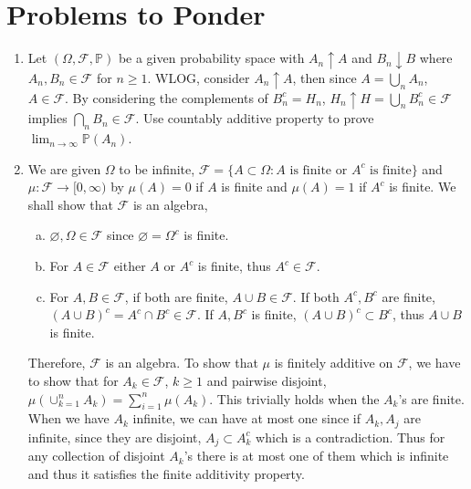 \documentclass[a4paper,10pt]{article}
\theoremstyle{definition}
\begin{document}
\section*{Problems to Ponder}

\begin{enumerate}
\item Let $(\Omega, \mathcal{F}, \mathbb{P})$ be a given probability space with $A_n \uparrow A$ and $B_n \downarrow B$ where $A_n, B_n \in \mathcal{F}$ for $n \geq 1$. WLOG, consider $A_n \uparrow A$, then since $A = \bigcup_nA_n$, $A \in \mathcal{F}$. By considering the complements of $B_n^c = H_n$, $H_n \uparrow H = \bigcup_n B_n^c \in \mathcal{F}$ implies $\bigcap_nB_n \in \mathcal{F}$. Use countably additive property to prove $\lim_{n\to\infty}\mathbb{P}(A_n)$. 

\item We are given $\Omega$ to be infinite, $\mathcal{F} = \{A \subset \Omega: A \text{ is finite or } A^c \text{ is finite}\}$ and $\mu: \mathcal{F}\to [0,\infty)$ by $\mu(A)=0$ if $A$ is finite and $\mu(A) = 1$ if $A^c$ is finite. We shall show that $\mathcal{F}$ is an algebra,
\begin{enumerate}[(a)]
\item $\varnothing, \Omega \in \mathcal{F}$ since $\varnothing = \Omega^c$ is finite. 
\item For $A \in \mathcal{F}$ either $A$ or $A^c$ is finite, thus $A^c \in \mathcal{F}$.
\item For $A, B \in \mathcal{F}$, if both are finite, $A \cup B \in \mathcal{F}$. If both $A^c, B^c$ are finite, $(A \cup B)^c = A^c \cap B^c \in \mathcal{F}$. If $A, B^c$ is finite, $(A \cup B)^c \subset B^c$, thus $A \cup B$ is finite.
\end{enumerate}
Therefore, $\mathcal{F}$ is an algebra. To show that $\mu$ is finitely additive on $\mathcal{F}$, we have to show that for $A_k \in \mathcal{F}$, $k \geq 1$ and pairwise disjoint, $\mu(\cup_{k=1}^nA_k) = \sum_{i=1}^n\mu(A_k)$. This trivially holds when the $A_k$'s are finite. When we have $A_k$ infinite, we can have at most one since if $A_k, A_j$ are infinite, since they are disjoint, $A_j \subset A_k^c$ which is a contradiction. Thus for any collection of disjoint $A_k$'s there is at most one of them which is infinite and thus it satisfies the finite additivity property.


\end{enumerate}
\end{document}
